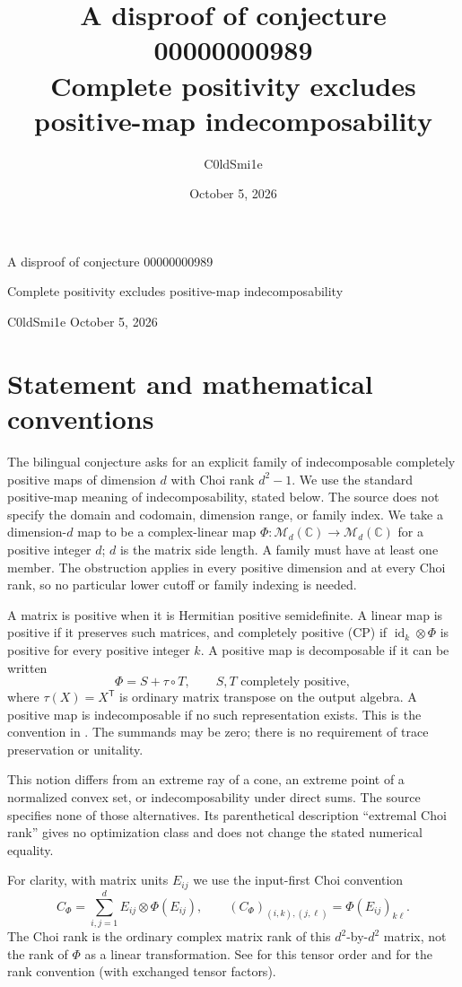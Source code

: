 \documentclass[11pt]{article}
\title{A disproof of conjecture 00000000989\\\large Complete positivity excludes positive-map indecomposability}
\author{C0ldSmi1e}
\date{October 5, 2026}
\newcommand{\Mat}{\mathcal M}
\begin{document}
\begin{center}
{\LARGE A disproof of conjecture 00000000989\par}
\vspace{5pt}
{\large Complete positivity excludes positive-map indecomposability\par}
\vspace{10pt}
C0ldSmi1e \quad\textbullet\quad October 5, 2026
\end{center}

\section{Statement and mathematical conventions}
The bilingual conjecture asks for an explicit family of indecomposable
completely positive maps of dimension $d$ with Choi rank $d^2-1$.
We use the standard positive-map meaning of indecomposability, stated below.
The source does not specify the domain and codomain, dimension range, or
family index. We take a dimension-$d$ map to be a complex-linear map
$\Phi:\Mat_d(\mathbb C)\to\Mat_d(\mathbb C)$ for a positive integer $d$;
$d$ is the matrix side length. A family must have at least one member.
The obstruction applies in every positive dimension and at every Choi rank,
so no particular lower cutoff or family indexing is needed.

A matrix is positive when it is Hermitian positive semidefinite. A linear map
is positive if it preserves such matrices, and completely positive (CP) if
$\operatorname{id}_k\otimes\Phi$ is positive for every positive integer $k$.
A positive map is decomposable if it can be written
\[
 \Phi=S+\tau\circ T,
 \qquad S,T\text{ completely positive},
\]
where $\tau(X)=X^{\mathsf T}$ is ordinary matrix transpose on the output
algebra. A positive map is indecomposable if no such representation exists.
This is the convention in \cite[Section~1]{mh}. The summands may be zero;
there is no requirement of trace preservation or unitality.

This notion differs from an extreme ray of a cone, an extreme point of a
normalized convex set, or indecomposability under direct sums. The source
specifies none of those alternatives. Its parenthetical description
``extremal Choi rank'' gives no optimization class and does not change the
stated numerical equality.

For clarity, with matrix units $E_{ij}$ we use the input-first Choi convention
\[
 C_\Phi=\sum_{i,j=1}^{d}E_{ij}\otimes\Phi(E_{ij}),
 \qquad
 (C_\Phi)_{(i,k),(j,\ell)}=\Phi(E_{ij})_{k\ell}.
\]
The Choi rank is the ordinary complex matrix rank of this $d^2$-by-$d^2$
matrix, not the rank of $\Phi$ as a linear transformation. See
\cite[Section~2]{mh} for this tensor order and \cite[Section~1]{girard}
for the rank convention (with exchanged tensor factors).
\end{document}
